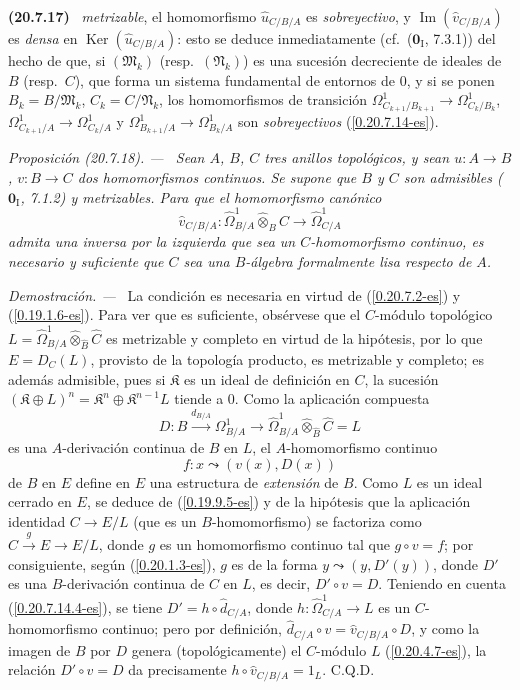\documentclass[10pt,oneside]{book}
\makeatletter
\newcommand{\sref}[1]{\textup{(\ref{#1})}}
\newcommand{\setmanualcurrentlabel}[1]{\def\@currentlabel{#1}}
\newcommand{\oldpage}[2][]{%
  \setcounter{footnote}{0}%
  \marginpar{\scriptsize\textbf{#1}~|~#2}\ignorespaces}
\newenvironment{env}[1][]{\setmanualcurrentlabel{#1}\par\medskip\noindent\textbf{(#1)}\ }{\par}
\newenvironment{proposition}[1][]{%
  \setmanualcurrentlabel{#1}\par\medskip\noindent\itshape Proposición (#1). ---\ }{\par}
\newenvironment{proof}{%
  \par\medskip\noindent\textit{Demostración. ---\ }}{\par}
\makeatother
\begin{document}
\begin{env}[20.7.17]
\emph{metrizable}, el homomorfismo $\widehat u_{C/B/A}$ es \emph{sobreyectivo},
y $\operatorname{Im}(\widehat v_{C/B/A})$ es \emph{densa} en
$\operatorname{Ker}(\widehat u_{C/B/A})$: esto se deduce inmediatamente
(cf.\ ($\mathbf{0}_{\mathrm I}$, 7.3.1)) del hecho de que, si
$(\mathfrak{M}_k)$ (resp.\ $(\mathfrak{N}_k)$) es una sucesión decreciente
de ideales de $B$ (resp.\ $C$), que forma un sistema fundamental de entornos
de $0$, y si se ponen $B_k=B/\mathfrak{M}_k$, $C_k=C/\mathfrak{N}_k$, los
homomorfismos de transición
$\Omega^1_{C_{k+1}/B_{k+1}}\to\Omega^1_{C_k/B_k}$,
$\Omega^1_{C_{k+1}/A}\to\Omega^1_{C_k/A}$ y
$\Omega^1_{B_{k+1}/A}\to\Omega^1_{B_k/A}$ son \emph{sobreyectivos}
\sref{0.20.7.14-es}.
\end{env}

\begin{proposition}[20.7.18]
\label{0.20.7.18-es}
Sean $A$, $B$, $C$ tres anillos topológicos, y sean $u:A\to B$, $v:B\to C$
dos homomorfismos continuos. Se supone que $B$ y $C$ son admisibles
\textup{($\mathbf{0}_{\mathrm I}$, 7.1.2)} y metrizables. Para que el homomorfismo
canónico
\[
  \widehat v_{C/B/A}:\widehat{\Omega}^1_{B/A}
  \widehat\otimes_B C\to\widehat{\Omega}^1_{C/A}
\]
admita una inversa por la izquierda que sea un $C$-homomorfismo continuo, es
necesario y suficiente que $C$ sea una $B$-álgebra formalmente lisa respecto
de $A$.
\end{proposition}

\begin{proof}
La condición es necesaria en virtud de \sref{0.20.7.2-es} y
\sref{0.19.1.6-es}. Para ver que es suficiente, obsérvese que el $C$-módulo
topológico
$L=\widehat{\Omega}^1_{B/A}\widehat\otimes_{\widehat B}\widehat C$ es
metrizable y
\oldpage[0\textsubscript{IV-1}]{153}
completo en virtud de la hipótesis, por lo que
$E=D_C(L)$, provisto de la topología producto, es metrizable y completo; es
además admisible, pues si $\mathfrak K$ es un ideal de definición en $C$, la
sucesión $(\mathfrak K\oplus L)^n=\mathfrak K^n\oplus\mathfrak K^{n-1}L$
tiende a $0$. Como la aplicación compuesta
\[
  D:B\xrightarrow{d_{B/A}}\Omega^1_{B/A}\to
  \widehat{\Omega}^1_{B/A}\widehat\otimes_{\widehat B}\widehat C=L
\]
es una $A$-derivación continua de $B$ en $L$, el $A$-homomorfismo continuo
\[
  f:x\leadsto(v(x),D(x))
\]
de $B$ en $E$ define en $E$ una estructura de \emph{extensión} de $B$. Como $L$ es
un ideal cerrado en $E$, se deduce de \sref{0.19.9.5-es} y de la hipótesis que
la aplicación identidad $C\to E/L$ (que es un $B$-homomorfismo) se factoriza
como $C\xrightarrow{g}E\to E/L$, donde $g$ es un homomorfismo continuo tal
que $g\circ v=f$; por consiguiente, según \sref{0.20.1.3-es}, $g$ es de la
forma $y\leadsto(y,D'(y))$, donde $D'$ es una $B$-derivación continua de $C$ en
$L$, es decir, $D'\circ v=D$. Teniendo en cuenta \sref{0.20.7.14.4-es}, se
tiene $D'=h\circ\widehat d_{C/A}$, donde
$h:\widehat{\Omega}^1_{C/A}\to L$ es un $C$-homomorfismo continuo; pero por
definición, $\widehat d_{C/A}\circ v=\widehat v_{C/B/A}\circ D$, y como la
imagen de $B$ por $D$ genera (topológicamente) el $C$-módulo $L$
\sref{0.20.4.7-es}, la relación $D'\circ v=D$ da precisamente
$h\circ\widehat v_{C/B/A}=1_L$. C.Q.D.
\end{proof}
\end{document}
